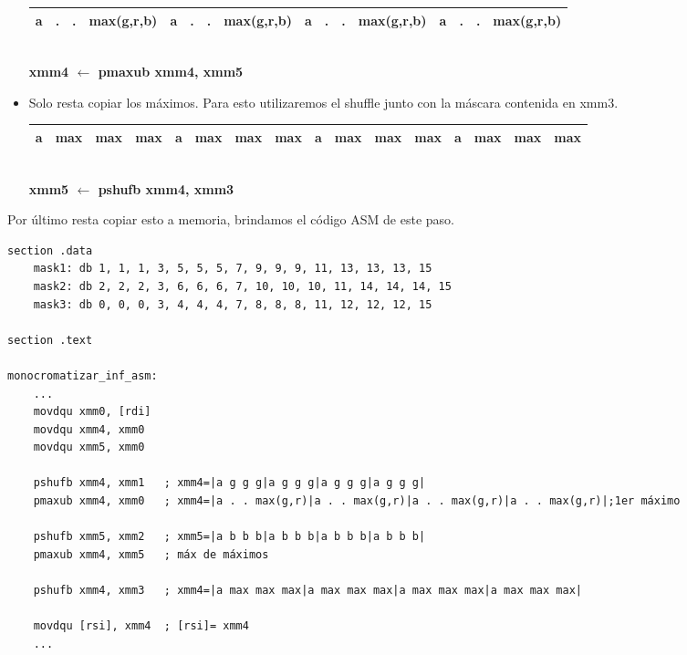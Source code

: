 \begin{itemize}
		\begin{center}
		   \begin{tabular}{| c | c | c | c || c | c | c | c || c | c | c | c || c | c | c | c |}
			 \hline
			 a & . & . & max(g,r,b) & a & . & . & max(g,r,b) & a & . & . & max(g,r,b) & a & . & . & max(g,r,b)  \\ \hline
		   \end{tabular}
		   \\ \textbf{xmm4 $\gets$ pmaxub xmm4, xmm5}
		\end{center}


	\item Solo resta copiar los máximos. Para esto utilizaremos el shuffle junto con la máscara contenida en xmm3.

		\begin{center}
		   \begin{tabular}{| c | c | c | c || c | c | c | c || c | c | c | c || c | c | c | c |}
			 \hline
			 a & max & max & max & a & max & max & max & a & max & max & max & a & max & max & max  \\ \hline
		   \end{tabular}
		   \\ \textbf{xmm5 $\gets$ pshufb xmm4, xmm3}
		\end{center}

\end{itemize}

Por último resta copiar esto a memoria, brindamos el código ASM de este paso.

\begin{codesnippet}
\begin{verbatim}
section .data
	mask1: db 1, 1, 1, 3, 5, 5, 5, 7, 9, 9, 9, 11, 13, 13, 13, 15
	mask2: db 2, 2, 2, 3, 6, 6, 6, 7, 10, 10, 10, 11, 14, 14, 14, 15
	mask3: db 0, 0, 0, 3, 4, 4, 4, 7, 8, 8, 8, 11, 12, 12, 12, 15

section .text

monocromatizar_inf_asm:
	...
	movdqu xmm0, [rdi] 
	movdqu xmm4, xmm0	
	movdqu xmm5, xmm0	

	pshufb xmm4, xmm1	; xmm4=|a g g g|a g g g|a g g g|a g g g|
	pmaxub xmm4, xmm0	; xmm4=|a . . max(g,r)|a . . max(g,r)|a . . max(g,r)|a . . max(g,r)|;1er máximo

	pshufb xmm5, xmm2	; xmm5=|a b b b|a b b b|a b b b|a b b b|			
	pmaxub xmm4, xmm5	; máx de máximos

	pshufb xmm4, xmm3	; xmm4=|a max max max|a max max max|a max max max|a max max max|

	movdqu [rsi], xmm4	; [rsi]= xmm4
	...
\end{verbatim}
\end{codesnippet}